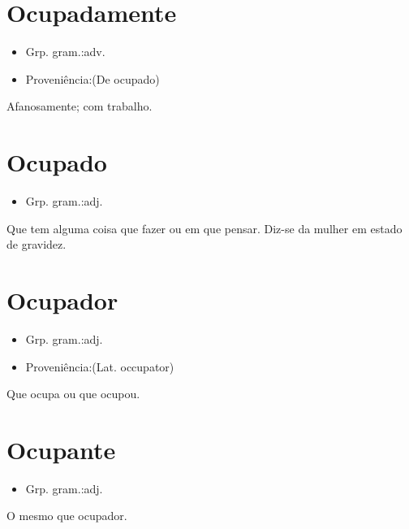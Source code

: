 \section{Ocupadamente}
\begin{itemize}
\item {Grp. gram.:adv.}
\end{itemize}
\begin{itemize}
\item {Proveniência:(De \textunderscore ocupado\textunderscore )}
\end{itemize}
Afanosamente; com trabalho.
\section{Ocupado}
\begin{itemize}
\item {Grp. gram.:adj.}
\end{itemize}
Que tem alguma coisa que fazer ou em que pensar.
Diz-se da mulher em estado de gravidez.
\section{Ocupador}
\begin{itemize}
\item {Grp. gram.:adj.}
\end{itemize}
\begin{itemize}
\item {Proveniência:(Lat. \textunderscore occupator\textunderscore )}
\end{itemize}
Que ocupa ou que ocupou.
\section{Ocupante}
\begin{itemize}
\item {Grp. gram.:adj.}
\end{itemize}
O mesmo que \textunderscore ocupador\textunderscore .
